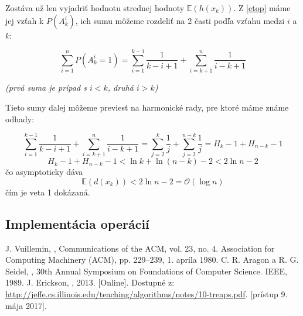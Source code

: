 \documentclass[a4paper, 12pt]{article}
\theoremstyle{definition}
\begin{document}
Zostáva už len vyjadriť hodnotu strednej hodnoty $\mathbb{E}(h(x_k))$. Z
\ref{etop} máme jej vzťah k $P(A^i_k)$, ich sumu môžeme rozdeliť na 2 časti
podľa vzťahu medzi $i$ a $k$:

\begin{equation}
    \sum_{i=1}^n P(A^i_k = 1) = \sum_{i=1}^{k-1} \frac{1}{k-i+1} +
    \sum_{i=k+1}^{n} \frac{1}{i-k+1}
\end{equation}

\begin{center}
\emph{(prvá suma je prípad s $i < k$, druhá $i > k$)}
\end{center}

Tieto sumy ďalej môžeme previesť na harmonické rady, pre ktoré máme známe
odhady:

\begin{equation}
    \sum_{i=1}^{k-1} \frac{1}{k-i+1} + \sum_{i=k+1}^{n} \frac{1}{i-k+1}
    = \sum_{j=2}^{k} \frac{1}{j} + \sum_{j=2}^{n-k} \frac{1}{j}
    = H_k - 1 + H_{n-k} - 1
\end{equation}
\begin{equation}
    H_k - 1 + H_{n-k} - 1 < \ln k + \ln(n-k) - 2 < 2 \ln n - 2
\end{equation}
čo asymptoticky dáva
\begin{equation}
    \mathbb{E}(d(x_k)) < 2 \ln n - 2 = \mathcal{O}(\log n)
\end{equation}
čím je veta 1 dokázaná.

\subsection{Implementácia operácií}


\begin{thebibliography}{9}
    J. Vuillemin, , Communications of the ACM,
        vol. 23, no. 4. Association for Computing Machinery (ACM), pp. 229–239,
        1. apríla 1980.
    C. R. Aragon a R. G. Seidel, , 30th Annual
        Symposium on Foundations of Computer Science. IEEE, 1989.
    J. Erickson, , 2013. [Online]. Dostupné
        z:
        \url{http://jeffe.cs.illinois.edu/teaching/algorithms/notes/10-treaps.pdf}.
        [prístup 9. mája 2017].
\end{thebibliography}
\end{document}
